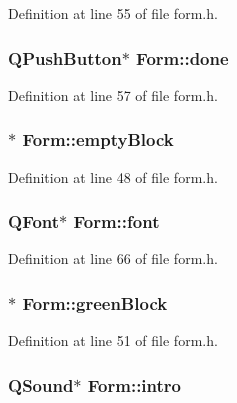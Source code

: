 Definition at line 55 of file form.h.\hypertarget{class_form_a7c08dcd5710197574486d9ea139de923}{
\subsubsection[{done}]{\setlength{\rightskip}{0pt plus 5cm}QPushButton$\ast$ {\bf Form::done}}}
\label{class_form_a7c08dcd5710197574486d9ea139de923}


Definition at line 57 of file form.h.\hypertarget{class_form_a4bd31a76f382c885ce3d1cb6a19568eb}{
\subsubsection[{emptyBlock}]{$\ast$ {\bf Form::emptyBlock}}}
\label{class_form_a4bd31a76f382c885ce3d1cb6a19568eb}


Definition at line 48 of file form.h.\hypertarget{class_form_afae663257f81258f2f8667d621fe0f48}{
\subsubsection[{font}]{\setlength{\rightskip}{0pt plus 5cm}QFont$\ast$ {\bf Form::font}}}
\label{class_form_afae663257f81258f2f8667d621fe0f48}


Definition at line 66 of file form.h.\hypertarget{class_form_aec10e23211aa0c2401b1cf9c7db50396}{
\subsubsection[{greenBlock}]{$\ast$ {\bf Form::greenBlock}}}
\label{class_form_aec10e23211aa0c2401b1cf9c7db50396}


Definition at line 51 of file form.h.\hypertarget{class_form_a9a0efcb36e9c6f17a1a8a9b8976dccba}{
\subsubsection[{intro}]{\setlength{\rightskip}{0pt plus 5cm}QSound$\ast$ {\bf Form::intro}}}
\label{class_form_a9a0efcb36e9c6f17a1a8a9b8976dccba}


